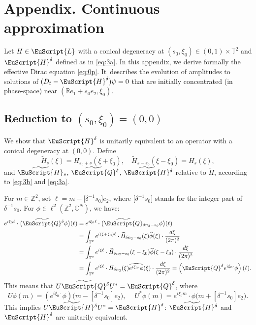 \documentclass[10pt]{amsart}
\let\pazocal\EuScript
\theoremstyle{definition}
\newcommand{\QQ}{{\pazocal{Q}}}
\newcommand{\LL}{{\pazocal{L}}}
\newcommand{\HH}{\pazocal{H}}
\newcommand{\tHH}{\widetilde{\HH}{}}
\newcommand{\tQQ}{\widetilde{\QQ}{}}
\newcommand{\C}{\mathbb{C}}
\newcommand{\R}{\mathbb{R}}
\newcommand{\Z}{\mathbb{Z}}
\newcommand{\Tt}{{\mathbb{T}}}
\newcommand{\tH}{{\widetilde{H}}}
\newcommand{\hphi}{{\widehat{\phi}}}
\begin{document}
\appendix
{}
\section*{Appendix. Continuous approximation}
Let $H \in \LL$ with a conical degeneracy at $(s_0, \xi_0) \in (0,1) \times \Tt^2$ and $\HH^\delta$ defined as in \eqref{eq:3a}. In this appendix, we derive formally the effective Dirac equation \eqref{eq:0p}. It~describes the evolution of amplitudes to solutions of $(D_t-\HH^\delta) \psi = 0$ that are initially concentrated (in phase-space) near $(\R e_1+s_0e_2,\xi_0)$.

\subsection{Reduction to $(s_0, \xi_0) = (0,0)$}\label{sec:6.1} We show that $\HH^\delta$ is unitarily equivalent to an operator with a conical degeneracy at $(0,0)$. Define
\begin{equation}\label{eq:3f}
\tH_s(\xi) = H_{s_0+s}(\xi+\xi_0), \quad \tH_{s-s_0}(\xi-\xi_0) = H_s(\xi),
\end{equation}
and $\tHH_s$, $\tQQ^\delta$, $\tHH^\delta$ relative to $\tH$, according to \eqref{eq:3b} and \eqref{eq:3a}.

For $m \in \Z^2$, set $\ell = m - \bigl[\delta^{-1} s_0\bigr] e_2$, where $\bigl[\delta^{-1} s_0\bigr]$ stands for the integer part of $\delta^{-1} s_0$.
For $\phi \in \ell^2(\Z^2,\C^N)$, we have:
\[
\begin{split}
e^{i\xi_0 \ell } \cdot \bigl( \tQQ^\delta \phi \bigr)(\ell)
&= e^{i\xi_0 \ell } \cdot \bigl( \tQQ_{\delta n_2-s_0} \phi \bigr)(\ell)
\\
&= \int_{\Tt^2} e^{i(\xi+\xi_0) \ell} \cdot \tH_{\delta n_2-s_0}(\xi) \hphi(\xi) \cdot \dfrac{d\xi}{(2\pi)^2}\\
&= \int_{\Tt^2} e^{i\xi \ell} \cdot \tH_{\delta n_2-s_0}(\xi-\xi_0) \hphi(\xi-\xi_0) \cdot \dfrac{d\xi}{(2\pi)^2}
\\
&= \int_{\Tt^2} e^{i\xi \ell} \cdot H_{\delta n_2}(\xi) \widehat{e^{i\xi_0 \cdot}\phi}(\xi) \cdot \dfrac{d\xi}{(2\pi)^2} = \left(\QQ^\delta e^{i\xi_0 \cdot} \phi\right) (\ell).
\end{split}
\]
This means that $U \tQQ^\delta U^* = \QQ^\delta$, where
\begin{equation*}
U \phi(m) = \left(e^{i\xi_0 \cdot} \phi\right)\bigl( m - [\delta^{-1}s_0] e_2\bigr), \quad \ U^* \phi(m) = e^{i\xi_0 m} \cdot \phi\bigl( m + [\delta^{-1}s_0] e_2 \bigr).
\end{equation*}
This implies $U \tHH^\delta U^* = \HH^\delta$: $\tHH^\delta$ and $\HH^\delta$ are unitarily equivalent.
\end{document}

